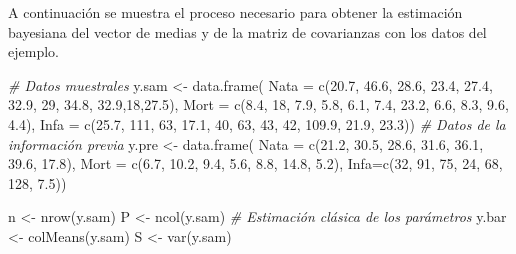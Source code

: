 \documentclass[
  10pt,
  spanish,
]{book}
\newenvironment{Shaded}{\begin{snugshade}}{\end{snugshade}}
\newcommand{\AttributeTok}[1]{\textcolor[rgb]{0.77,0.63,0.00}{#1}}
\newcommand{\CommentTok}[1]{\textcolor[rgb]{0.56,0.35,0.01}{\textit{#1}}}
\newcommand{\DecValTok}[1]{\textcolor[rgb]{0.00,0.00,0.81}{#1}}
\newcommand{\FloatTok}[1]{\textcolor[rgb]{0.00,0.00,0.81}{#1}}
\newcommand{\FunctionTok}[1]{\textcolor[rgb]{0.00,0.00,0.00}{#1}}
\newcommand{\NormalTok}[1]{#1}
\newcommand{\OtherTok}[1]{\textcolor[rgb]{0.56,0.35,0.01}{#1}}
\theoremstyle{definition}
\theoremstyle{definition}
\theoremstyle{definition}
\theoremstyle{definition}
\theoremstyle{remark}
\begin{document}
A continuación se muestra el proceso necesario para obtener la estimación bayesiana del vector de medias y de la matriz de covarianzas con los datos del ejemplo.

\begin{Shaded}
\begin{Highlighting}[]
\CommentTok{\# Datos muestrales}
\NormalTok{y.sam }\OtherTok{\textless{}{-}} \FunctionTok{data.frame}\NormalTok{(}
  \AttributeTok{Nata =} \FunctionTok{c}\NormalTok{(}\FloatTok{20.7}\NormalTok{, }\FloatTok{46.6}\NormalTok{, }\FloatTok{28.6}\NormalTok{, }\FloatTok{23.4}\NormalTok{, }\FloatTok{27.4}\NormalTok{, }
           \FloatTok{32.9}\NormalTok{, }\DecValTok{29}\NormalTok{, }\FloatTok{34.8}\NormalTok{, }\FloatTok{32.9}\NormalTok{,}\DecValTok{18}\NormalTok{,}\FloatTok{27.5}\NormalTok{), }
  \AttributeTok{Mort =} \FunctionTok{c}\NormalTok{(}\FloatTok{8.4}\NormalTok{, }\DecValTok{18}\NormalTok{, }\FloatTok{7.9}\NormalTok{, }\FloatTok{5.8}\NormalTok{, }\FloatTok{6.1}\NormalTok{, }\FloatTok{7.4}\NormalTok{,}
           \FloatTok{23.2}\NormalTok{, }\FloatTok{6.6}\NormalTok{, }\FloatTok{8.3}\NormalTok{, }\FloatTok{9.6}\NormalTok{, }\FloatTok{4.4}\NormalTok{),}
  \AttributeTok{Infa =} \FunctionTok{c}\NormalTok{(}\FloatTok{25.7}\NormalTok{, }\DecValTok{111}\NormalTok{, }\DecValTok{63}\NormalTok{, }\FloatTok{17.1}\NormalTok{, }\DecValTok{40}\NormalTok{, }\DecValTok{63}\NormalTok{,}
           \DecValTok{43}\NormalTok{, }\DecValTok{42}\NormalTok{, }\FloatTok{109.9}\NormalTok{, }\FloatTok{21.9}\NormalTok{, }\FloatTok{23.3}\NormalTok{))}
\CommentTok{\# Datos de la información previa}
\NormalTok{y.pre }\OtherTok{\textless{}{-}} \FunctionTok{data.frame}\NormalTok{(}
  \AttributeTok{Nata =} \FunctionTok{c}\NormalTok{(}\FloatTok{21.2}\NormalTok{, }\FloatTok{30.5}\NormalTok{, }\FloatTok{28.6}\NormalTok{, }\FloatTok{31.6}\NormalTok{, }
           \FloatTok{36.1}\NormalTok{, }\FloatTok{39.6}\NormalTok{, }\FloatTok{17.8}\NormalTok{),}
  \AttributeTok{Mort =} \FunctionTok{c}\NormalTok{(}\FloatTok{6.7}\NormalTok{, }\FloatTok{10.2}\NormalTok{, }\FloatTok{9.4}\NormalTok{, }\FloatTok{5.6}\NormalTok{,}
           \FloatTok{8.8}\NormalTok{, }\FloatTok{14.8}\NormalTok{, }\FloatTok{5.2}\NormalTok{),}
  \AttributeTok{Infa=}\FunctionTok{c}\NormalTok{(}\DecValTok{32}\NormalTok{, }\DecValTok{91}\NormalTok{, }\DecValTok{75}\NormalTok{, }\DecValTok{24}\NormalTok{, }\DecValTok{68}\NormalTok{, }\DecValTok{128}\NormalTok{, }\FloatTok{7.5}\NormalTok{))}

\NormalTok{n }\OtherTok{\textless{}{-}} \FunctionTok{nrow}\NormalTok{(y.sam)}
\NormalTok{P }\OtherTok{\textless{}{-}} \FunctionTok{ncol}\NormalTok{(y.sam)}
\CommentTok{\# Estimación clásica de los parámetros}
\NormalTok{y.bar }\OtherTok{\textless{}{-}} \FunctionTok{colMeans}\NormalTok{(y.sam) }
\NormalTok{S }\OtherTok{\textless{}{-}} \FunctionTok{var}\NormalTok{(y.sam)}


\end{Highlighting}
\end{Shaded}
\end{document}
